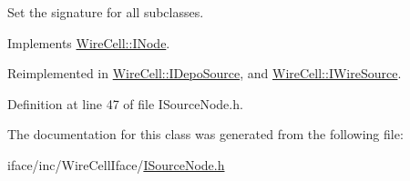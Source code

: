 Set the signature for all subclasses. 



Implements \hyperlink{class_wire_cell_1_1_i_node_a0b0763465adf5ba7febe8e378162b584}{Wire\+Cell\+::\+I\+Node}.



Reimplemented in \hyperlink{class_wire_cell_1_1_i_depo_source_a2d49f81dff56ffe7fefed50219395c3b}{Wire\+Cell\+::\+I\+Depo\+Source}, and \hyperlink{class_wire_cell_1_1_i_wire_source_ad72fdd8f8e747a7ea5707fb5b0eef594}{Wire\+Cell\+::\+I\+Wire\+Source}.



Definition at line 47 of file I\+Source\+Node.\+h.



The documentation for this class was generated from the following file\+:\begin{DoxyCompactItemize}
\item 
iface/inc/\+Wire\+Cell\+Iface/\hyperlink{_i_source_node_8h}{I\+Source\+Node.\+h}\end{DoxyCompactItemize}

